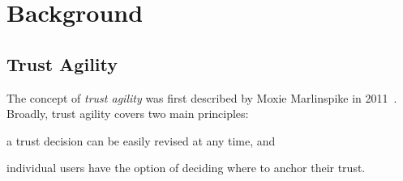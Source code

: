 \section{Background}
\label{sec:background}

\subsection{Trust Agility}
\label{sec:background:agility}

The concept of \emph{trust agility} was first described by Moxie Marlinspike in
2011~\cite{marlinspike2011ssl}. Broadly, trust agility covers two main
principles:
\begin{inparaenum}
\item a trust decision can be easily revised at any time, and
\item individual users have the option of deciding where to anchor their trust.
\end{inparaenum}
